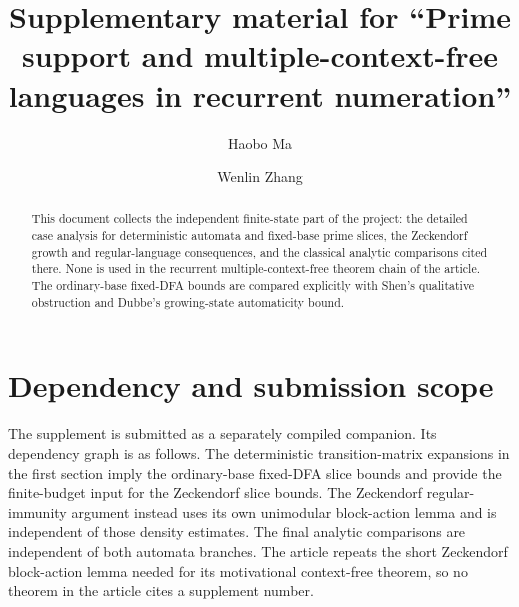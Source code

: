 \documentclass[11pt,a4paper]{amsart}
\title[Supplementary material]{Supplementary material for ``Prime support and multiple-context-free languages in recurrent numeration''}
\author{Haobo Ma}
\author{Wenlin Zhang}
\date{}
\begin{document}
\begin{abstract}
This document collects the independent finite-state part of the project:
the detailed case analysis for deterministic automata and fixed-base prime
slices, the Zeckendorf growth and regular-language consequences, and the
classical analytic comparisons cited there. None is used in the recurrent
multiple-context-free theorem chain of the article. The ordinary-base
fixed-DFA bounds are compared explicitly with Shen's qualitative obstruction
and Dubbe's growing-state automaticity bound.
\end{abstract}

\maketitle

\section*{Dependency and submission scope}

The supplement is submitted as a separately compiled companion. Its
dependency graph is as follows. The deterministic transition-matrix
expansions in the first section imply the ordinary-base fixed-DFA slice
bounds and provide the finite-budget input for the Zeckendorf slice bounds.
The Zeckendorf regular-immunity argument instead uses its own unimodular
block-action lemma and is independent of those density estimates. The final
analytic comparisons are independent of both automata branches. The article
repeats the short Zeckendorf block-action lemma needed for its motivational
context-free theorem, so no theorem in the article cites a supplement number.



\appendix



\end{document}
